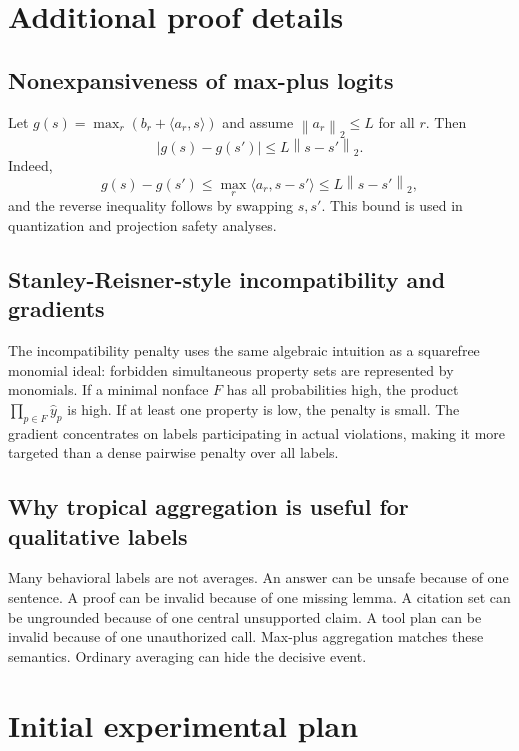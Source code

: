 \documentclass[11pt]{article}
\theoremstyle{definition}
\theoremstyle{remark}
\newcommand{\norm}[1]{\left\lVert #1\right\rVert}
\numberwithin{equation}{section}
\begin{document}
\appendix
\section{Additional proof details}

\subsection{Nonexpansiveness of max-plus logits}
Let \(g(s)=\max_r(b_r+\langle a_r,s\rangle)\) and assume \(\norm{a_r}_2\le L\) for all \(r\).  Then
\begin{equation}
    |g(s)-g(s')|\le L\norm{s-s'}_2.
\end{equation}
Indeed,
\begin{equation}
    g(s)-g(s')\le \max_r \langle a_r,s-s'\rangle\le L\norm{s-s'}_2,
\end{equation}
and the reverse inequality follows by swapping \(s,s'\).  This bound is used in quantization and projection safety analyses.

\subsection{Stanley-Reisner-style incompatibility and gradients}
The incompatibility penalty uses the same algebraic intuition as a squarefree monomial ideal: forbidden simultaneous property sets are represented by monomials.  If a minimal nonface \(F\) has all probabilities high, the product \(\prod_{p\in F}\hat y_p\) is high.  If at least one property is low, the penalty is small.  The gradient concentrates on labels participating in actual violations, making it more targeted than a dense pairwise penalty over all labels.

\subsection{Why tropical aggregation is useful for qualitative labels}
Many behavioral labels are not averages.  An answer can be unsafe because of one sentence.  A proof can be invalid because of one missing lemma.  A citation set can be ungrounded because of one central unsupported claim.  A tool plan can be invalid because of one unauthorized call.  Max-plus aggregation matches these semantics.  Ordinary averaging can hide the decisive event.

\section{Initial experimental plan}
\end{document}
